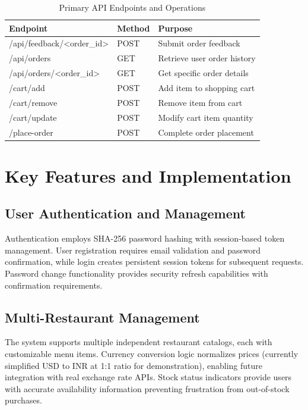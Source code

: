 \documentclass{ieeeaccess}
\begin{document}
\begin{table}[H]
\centering
\caption{Primary API Endpoints and Operations}
\begin{tabular}{lll}
\toprule
\textbf{Endpoint} & \textbf{Method} & \textbf{Purpose} \\
\midrule
/api/feedback/<order\_id> & POST & Submit order feedback \\
/api/orders & GET & Retrieve user order history \\
/api/orders/<order\_id> & GET & Get specific order details \\
/cart/add & POST & Add item to shopping cart \\
/cart/remove & POST & Remove item from cart \\
/cart/update & POST & Modify cart item quantity \\
/place-order & POST & Complete order placement \\
\bottomrule
\end{tabular}
\label{tab:api_endpoints}
\end{table}

\section{Key Features and Implementation}
\label{sec:features}

\subsection{User Authentication and Management}
Authentication employs SHA-256 password hashing with session-based token management. User registration requires email validation and password confirmation, while login creates persistent session tokens for subsequent requests. Password change functionality provides security refresh capabilities with confirmation requirements.

\subsection{Multi-Restaurant Management}
The system supports multiple independent restaurant catalogs, each with customizable menu items. Currency conversion logic normalizes prices (currently simplified USD to INR at 1:1 ratio for demonstration), enabling future integration with real exchange rate APIs. Stock status indicators provide users with accurate availability information preventing frustration from out-of-stock purchases.
\end{document}
